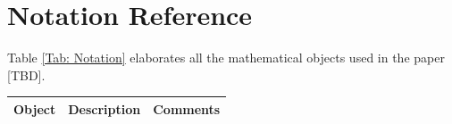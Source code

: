 \documentclass[
11pt,
titlepage,
reqno,
]{article}%
\theoremstyle{definition}
\begin{document}
\section{Notation Reference}
Table \ref{Tab: Notation} elaborates all the mathematical objects used in the paper [TBD].
\begin{table}\centering
{}
\begin{tabular}{@{}rll@{}}\toprule
Object                                             & \multicolumn{1}{c}{Description}                       & \multicolumn{1}{c}{Comments}\\ \midrule

\end{tabular}
\end{table}
\end{document}
